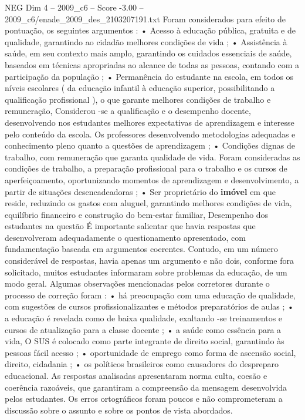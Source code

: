 \begin{textsample}{NEG Dim 4 – 2009\_c6 – Score -3.00 – 2009\_c6/enade\_2009\_des\_2103207191.txt}
Foram considerados para efeito de pontuação, os seguintes argumentos : • Acesso à educação pública, gratuita e de qualidade, garantindo ao cidadão melhores condições de vida ; • Assistência à saúde, em seu contexto mais amplo, garantindo os cuidados essenciais de saúde, baseados em técnicas apropriadas ao alcance de todas as pessoas, contando com a participação da população ; • Permanência do estudante na escola, em todos os níveis escolares ( da educação infantil à educação superior, possibilitando a qualificação profissional ), o que garante melhores condições de trabalho e remuneração, Considerou -se a qualificação e o desempenho docente, desenvolvendo nos estudantes melhores expectativas de aprendizagem e interesse pelo conteúdo da escola.
Os professores desenvolvendo metodologias adequadas e conhecimento pleno quanto a questões de aprendizagem ; • Condições dignas de trabalho, com remuneração que garanta qualidade de vida.
Foram consideradas as condições de trabalho, a preparação profissional para o trabalho e os cursos de aperfeiçoamento, oportunizando momentos de aprendizagem e desenvolvimento, a partir de situações desencadeadoras ; • Ser proprietário do \textbf{imóvel} em que reside, reduzindo os gastos com aluguel, garantindo melhores condições de vida, equilíbrio financeiro e construção do bem-estar familiar, Desempenho dos estudantes na questão É importante salientar que havia respostas que desenvolveram adequadamente o questionamento apresentado, com fundamentação baseada em argumentos coerentes.
Contudo, em um número considerável de respostas, havia apenas um argumento e não dois, conforme fora solicitado, muitos estudantes informaram sobre problemas da educação, de um modo geral.
Algumas observações mencionadas pelos corretores durante o processo de correção foram : • há preocupação com uma educação de qualidade, com sugestões de cursos profissionalizantes e métodos preparatórios de aulas ; • a educação é revelada como de baixa qualidade, exaltando -se treinamentos e cursos de atualização para a classe docente ; • a saúde como essência para a vida, O SUS é colocado como parte integrante de direito social, garantindo às pessoas fácil acesso ; • oportunidade de emprego como forma de ascensão social, direito, cidadania ; • os políticos brasileiros como causadores do despreparo educacional.
As respostas analisadas apresentaram norma culta, coesão e coerência razoáveis, que garantiram a compreensão da mensagem desenvolvida pelos estudantes.
Os erros ortográficos foram poucos e não comprometeram a discussão sobre o assunto e sobre os pontos de vista abordados.

\end{textsample}
